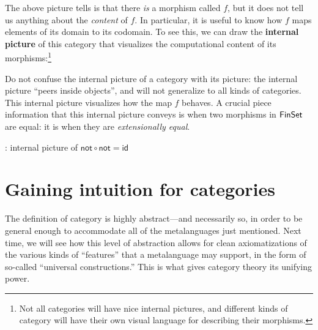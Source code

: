 The above picture tells is that there \emph{is} a morphism called $f$, 
but it does not tell us anything about the \emph{content} of $f$. In particular, 
it is useful to know how $f$ maps elements of its domain to its codomain. 
To see this, we can draw the \textbf{internal picture} of this category
that visualizes the computational content of its morphisms:\footnote{Not 
all categories will have nice internal pictures, and different kinds of category 
will have their own visual language for describing their morphisms.}

\begin{center}
\end{center}

Do not confuse the internal picture of a category with its picture: the internal 
picture ``peers inside objects'', and will not generalize to all kinds of categories.
This internal picture visualizes how the map $f$ behaves. A crucial 
piece information that this internal picture conveys is when two morphisms 
in \(\mathsf{FinSet}\) are equal: it is when they are \emph{extensionally equal}.

\todo: internal picture of \(\mathsf{not} \circ \mathsf{not} = \mathsf{id}\)


\section{Gaining intuition for categories}

The definition of category is highly abstract---and necessarily so, in order to be general enough
to accommodate all of the metalanguages just mentioned.
Next time, we will see how this level of abstraction allows for
clean axiomatizations of the various kinds of ``features'' that a metalanguage may support,
in the form of so-called ``universal constructions.''
This is what gives category theory its unifying power.

